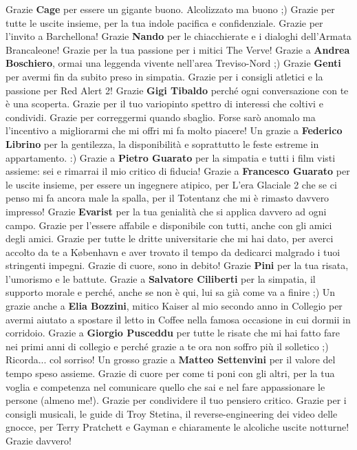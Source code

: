 \documentclass[10pt]{amsart}
\newcommand{\n}[1]{{\Large \bf #1}}
\begin{document}
Grazie \n{Cage} per essere un gigante buono. Alcolizzato ma buono ;) Grazie per tutte le uscite insieme, per la tua indole pacifica e confidenziale. Grazie per l'invito a Barchellona!
Grazie \n{Nando} per le chiacchierate e i dialoghi dell'Armata Brancaleone! Grazie per la tua passione per i mitici The Verve! 
Grazie a \n{Andrea Boschiero}, ormai una leggenda vivente nell'area Treviso-Nord ;) 
Grazie \n{Genti} per avermi fin da subito preso in simpatia. Grazie per i consigli atletici e la passione per Red Alert 2!
Grazie \n{Gigi Tibaldo} perché ogni conversazione con te è una scoperta. Grazie per il tuo variopinto spettro di interessi che coltivi e condividi. Grazie per correggermi quando sbaglio. Forse sarò anomalo ma l'incentivo a migliorarmi che mi offri mi fa molto piacere!  
Un grazie a \n{Federico Librino} per la gentilezza, la disponibilità e soprattutto le feste estreme in appartamento. :) 
Grazie a \n{Pietro Guarato} per la simpatia e tutti i film visti assieme: sei e rimarrai il mio critico di fiducia! 
Grazie a \n{Francesco Guarato} per le uscite insieme, per essere un ingegnere atipico, per L'era Glaciale 2 che se ci penso mi fa ancora male la spalla, per il Totentanz che mi è rimasto davvero impresso!
Grazie \n{Evarist} per la tua genialità che si applica davvero ad ogni campo. Grazie per l'essere affabile e disponibile con tutti, anche con gli amici degli amici. Grazie per tutte le dritte universitarie che mi hai dato, per averci accolto da te a København e aver trovato il tempo da dedicarci malgrado i tuoi stringenti impegni. Grazie di cuore, sono in debito!
Grazie \n{Pini} per la tua risata, l'umorismo e le battute. Grazie a \n{Salvatore Ciliberti} per la simpatia, il supporto morale e perché, anche se non è qui, lui sa già come va a finire ;) Un grazie anche a \n{Elia Bozzini}, mitico Kaiser al mio secondo anno in Collegio per avermi aiutato a spostare il letto in Coffee nella famosa occasione in cui dormii in corridoio. Grazie a \n{Giorgio Pusceddu} per tutte le risate che mi hai fatto fare nei primi anni di collegio e perché grazie a te ora non soffro più il solletico ;) Ricorda... col sorriso!
Un grosso grazie a \n{Matteo Settenvini} per il valore del tempo speso assieme. Grazie di cuore per come ti poni con gli altri, per la tua voglia e competenza nel comunicare quello che sai e nel fare appassionare le persone (almeno me!). Grazie per condividere il tuo pensiero critico. Grazie per i consigli musicali, le guide di Troy Stetina, il reverse-engineering dei video delle gnocce, per Terry Pratchett e Gayman e chiaramente le alcoliche uscite notturne! Grazie davvero! 
\end{document}
